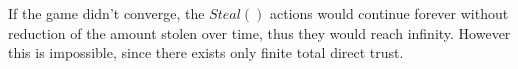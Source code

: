 \begin{proofsketch}
  If the game didn't converge, the $Steal\left(\right)$ actions would continue forever without reduction of the amount
  stolen over time, thus they would reach infinity. However this is impossible, since there exists only finite total
  direct trust.
\end{proofsketch}
